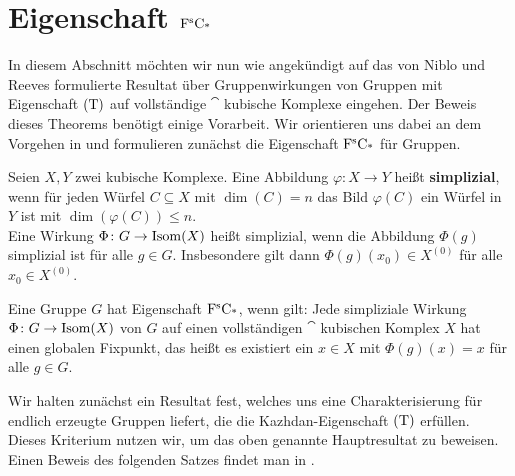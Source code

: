 \section{Eigenschaft $\operatorname{F^sC_*}$}
	In diesem Abschnitt möchten wir nun wie angekündigt auf das von Niblo und Reeves formulierte Resultat über Gruppenwirkungen von Gruppen mit Eigenschaft $\operatorname{(T)}$ auf vollständige $\cat$ kubische Komplexe eingehen. Der Beweis dieses Theorems benötigt einige Vorarbeit. Wir orientieren uns dabei an dem Vorgehen in \cite{NibloReeves} und formulieren zunächst die Eigenschaft $\operatorname{F^sC_*}$ für Gruppen.

\begin{defn}
	Seien $X, Y$ zwei kubische Komplexe. Eine Abbildung $\varphi \colon X \rightarrow Y$ heißt \textbf{simplizial}, wenn für jeden Würfel $C \subseteq X$ mit $\dim(C) = n$ das Bild $\varphi(C)$ ein Würfel in $Y$ ist mit $\dim(\varphi(C)) \leq n$. \\
	Eine Wirkung $\Phi \colon G \rightarrow \operatorname{Isom}(X)$ heißt simplizial, wenn die Abbildung $\Phi(g)$ simplizial ist für alle $g \in G$. Insbesondere gilt dann $\Phi(g)(x_0) \in X^{(0)}$ für alle $x_0 \in X^{(0)}$.
\end{defn}
		
\begin{defn}
	Eine Gruppe $G$ hat Eigenschaft $\operatorname{F^sC_*}$, wenn gilt: Jede simpliziale Wirkung $\Phi \colon G \rightarrow \operatorname{Isom}(X)$ von $G$ auf einen vollständigen $\cat$ kubischen Komplex $X$ hat einen globalen Fixpunkt, das heißt es existiert ein $x \in X$ mit $\Phi(g)(x) = x$ für alle $g \in G$.
\end{defn}

Wir halten zunächst ein Resultat fest, welches uns eine Charakterisierung für endlich erzeugte Gruppen liefert, die die Kazhdan-Eigenschaft $\operatorname{(T)}$ erfüllen. Dieses Kriterium nutzen wir, um das oben genannte Hauptresultat zu beweisen. Einen Beweis des folgenden Satzes findet man in \cite{BekkaHarpeValette}.

